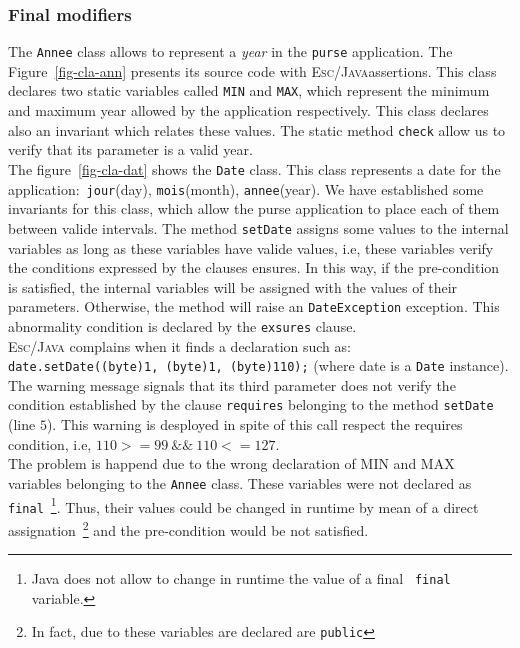 \documentclass[a4paper]{llncs}
\begin{document}
\subsubsection{Final modifiers}
The \texttt{Annee} class allows to represent a \textit{year} in the
\texttt{purse} application. The Figure~\ref{fig-cla-ann} presents its
source code with \textsc{Esc/Java}assertions. This class declares two 
static variables called \texttt{MIN} and \texttt{MAX}, which represent
the minimum and maximum year allowed by the application
respectively. This class declares
also an invariant which relates these values. The static method
\texttt{check} allow us to verify that its parameter is a valid
year. \\

The figure~\ref{fig-cla-dat} shows the \texttt{Date} class. This class
represents a date for the application$:$ \texttt{jour}(day),
\texttt{mois}(month), \texttt{annee}(year). We have established some
invariants for this class, which allow the purse application to place
each of them between valide intervals. The method \texttt{setDate}
assigns some values to the internal variables as long as
these variables have valide values, i.e, these variables verify the
conditions expressed by the clauses ensures. In this way, if the
pre-condition is satisfied, the internal variables will be assigned
with the values of their parameters. Otherwise, the method will raise
an \texttt{DateException} exception. This abnormality condition is
declared by the \texttt{exsures} clause. \\

\textsc{Esc/Java} complains when it finds a declaration such as$:$ \\
\mbox{\tt date.setDate((byte)1, (byte)1, (byte)110);} (where date is a
\texttt{Date} instance). The warning message signals that its third
parameter does not verify the condition established by the clause
\texttt{requires} belonging to the method \texttt{setDate} (line
$5$). This warning is desployed in spite of this call respect the
requires condition, i.e, $110>=99\ \&\&\ 110<= 127$. \\

The problem is happend due to the wrong declaration of \textsc{MIN}
and \textsc{MAX} variables belonging to the \texttt{Annee}
class. These variables were not declared as \texttt{final}~\footnote{{\sc
Java} does not allow to change in runtime the value of a final {\tt
final} variable.}. Thus, their values could be changed in runtime by
mean of a direct assignation~\footnote{In fact, due to these variables
are declared are \texttt{public}} and the pre-condition would be not
satisfied. \\
\end{document}
